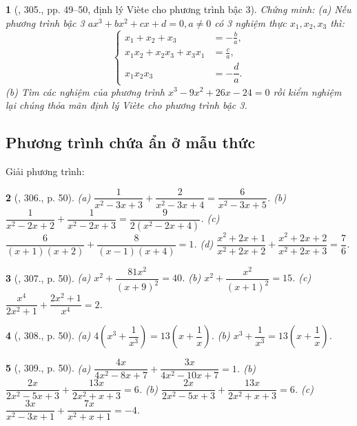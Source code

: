 \documentclass{article}
\newtheorem{baitoan}{}
\begin{document}
\begin{baitoan}[\cite{Binh_Toan_9_tap_2}, 305., pp. 49--50, định lý Vi\`ete cho phương trình bậc 3]
	Chứng minh: (a) Nếu phương trình bậc 3 $ax^3 + bx^2 + cx + d = 0,a\ne0$ có 3 nghiệm thực $x_1,x_2,x_3$ thì:
	\begin{equation*}
		\left\{\begin{split}
			x_1 + x_2 + x_3 &= -\frac{b}{a},\\
			x_1x_2 + x_2x_3 + x_3x_1 &= \frac{c}{a},\\
			x_1x_2x_3 &= -\dfrac{d}{a}.
		\end{split}\right.
	\end{equation*}
	(b) Tìm các nghiệm của phương trình $x^3 - 9x^2 + 26x - 24 = 0$ rồi kiểm nghiệm lại chúng thỏa mãn định lý Vi\`ete cho phương trình bậc 3.
\end{baitoan}

\subsection{Phương trình chứa ẩn ở mẫu thức}
Giải phương trình:

\begin{baitoan}[\cite{Binh_Toan_9_tap_2}, 306., p. 50]
	(a) $\dfrac{1}{x^2 - 3x + 3} + \dfrac{2}{x^2 - 3x + 4} = \dfrac{6}{x^2 - 3x + 5}$. (b) $\dfrac{1}{x^2 - 2x + 2} + \dfrac{1}{x^2 - 2x + 3} = \dfrac{9}{2(x^2 - 2x + 4)}$. (c) $\dfrac{6}{(x + 1)(x + 2)} + \dfrac{8}{(x - 1)(x + 4)} = 1$. (d) $\dfrac{x^2 + 2x + 1}{x^2 + 2x + 2} + \dfrac{x^2 + 2x + 2 }{x^2 + 2x + 3} = \dfrac{7}{6}$.
\end{baitoan}

\begin{baitoan}[\cite{Binh_Toan_9_tap_2}, 307., p. 50]
	(a) $x^2 + \dfrac{81x^2}{(x + 9)^2} = 40$. (b) $x^2 + \dfrac{x^2}{(x + 1)^2} = 15$. (c) $\dfrac{x^4}{2x^2 + 1} + \dfrac{2x^2 + 1}{x^4} = 2$.
\end{baitoan}

\begin{baitoan}[\cite{Binh_Toan_9_tap_2}, 308., p. 50]
	(a) $4\left(x^3 + \dfrac{1}{x^3}\right) = 13\left(x + \dfrac{1}{x}\right)$. (b) $x^3 + \dfrac{1}{x^3} = 13\left(x + \dfrac{1}{x}\right)$.
\end{baitoan}

\begin{baitoan}[\cite{Binh_Toan_9_tap_2}, 309., p. 50]
	(a) $\dfrac{4x}{4x^2 - 8x + 7} + \dfrac{3x}{4x^2 - 10x + 7} = 1$. (b) $\dfrac{2x}{2x^2 - 5x + 3} + \dfrac{13x}{2x^2 + x + 3} = 6$. (b) $\dfrac{2x}{2x^2 - 5x + 3} + \dfrac{13x}{2x^2 + x + 3} = 6$. (c) $\dfrac{3x}{x^2 - 3x + 1} + \dfrac{7x}{x^2 + x + 1} = -4$.
\end{baitoan}
\end{document}
